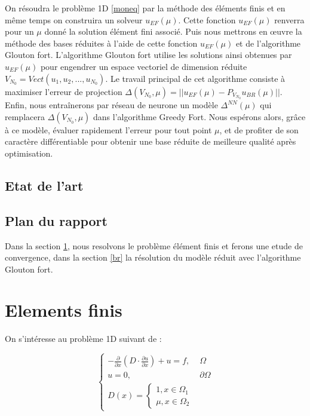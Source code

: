\documentclass[12pt]{article}
\begin{document}
On résoudra le problème 1D \eqref{moneq} par la méthode des éléments finis et en même temps on construira un solveur $u_{EF}(\mu)$. Cette fonction $u_{EF}(\mu)$ renverra pour un $\mu$ donné la solution élément fini associé. Puis nous mettrons en œuvre la méthode des bases réduites à l'aide de cette fonction $u_{EF}(\mu)$ et de l'algorithme Glouton fort. L'algorithme Glouton fort utilise les solutions ainsi obtenues par $u_{EF}(\mu)$ pour engendrer un espace vectoriel de dimension réduite $V_{N_0} = Vect(u_1,u_2,..., u_{N_0})$. Le travail principal de cet algorithme consiste à maximiser l'erreur de projection $\Delta(V_{N_0}, \mu) =||u_{EF}(\mu) - P_{V_{N_0}}u_{BR}(\mu)||$. Enfin, nous entraînerons par réseau de neurone un modèle $\Delta^{NN}(\mu)$ qui remplacera $\Delta(V_{N_0}, \mu)$ dans l'algorithme Greedy Fort. Nous espérons alors, grâce à ce modèle, évaluer rapidement l'erreur pour tout point $\mu$, et de profiter de son caractère différentiable pour obtenir une base réduite de meilleure qualité après optimisation.


\subsection{Etat de l'art}
\subsection{Plan du rapport }

Dans la section \ref{ef}, nous resolvons le problème élément finis et ferons une etude de convergence, dans la section \ref{br} la résolution du modèle réduit avec l'algorithme Glouton fort.









\section{Elements finis}
\label{ef}

On s'intéresse au problème 1D suivant de \cite{Alexandre Ern} :

\begin{equation}\label{moneq2}
\begin{cases} 
- \frac{\partial }{\partial x}(D \cdot \frac{\partial u}{\partial x}) + u = f , & \Omega   \\
u = 0 , & \partial \Omega \\
D(x) = 
\begin{cases} 
1 , x \in \Omega _{1} \\
\mu , x \in \Omega _{2}
\end{cases}
\end{cases}
\end{equation}
\end{document}
